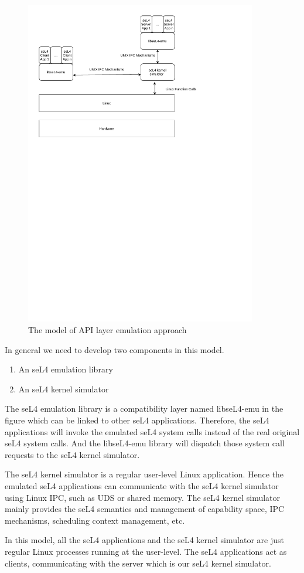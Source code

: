 \begin{figure}[h]
    \centering
    \includegraphics[clip, trim=0.5cm 16cm 3cm 0.5cm, width=0.9\textwidth, height=0.8\textwidth]{ch3/model1-v3.pdf}
    \caption{The model of API layer emulation approach}
    \label{fig:mapi}
\end{figure}

In general we need to develop two components in this model. 

\begin{enumerate}
\item An seL4 emulation library
\item An seL4 kernel simulator
\end{enumerate}

The seL4 emulation library is a compatibility layer named libseL4-emu in the figure which can be linked to other seL4 applications. Therefore, the seL4 applications will invoke the emulated seL4 system calls instead of the real original seL4 system calls. And the libseL4-emu library will dispatch those system call requests to the seL4 kernel simulator. 

The seL4 kernel simulator is a regular user-level Linux application. Hence the emulated seL4 applications can communicate with the seL4 kernel simulator using Linux IPC, such as UDS or shared memory. The seL4 kernel simulator mainly provides the seL4 semantics and management of capability space, IPC mechanisms, scheduling context management, etc. 

In this model, all the seL4 applications and the seL4 kernel simulator are just regular Linux processes running at the user-level. The seL4 applications act as clients, communicating with the server which is our seL4 kernel simulator. 

